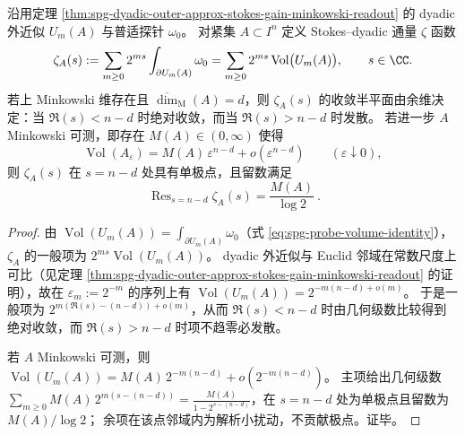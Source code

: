 \begin{proposition}\label{prop:spg-dyadic-flux-zeta-minkowski-pole}
沿用定理 \ref{thm:spg-dyadic-outer-approx-stokes-gain-minkowski-readout} 的 dyadic 外近似 \(U_m(A)\) 与普适探针 \(\omega_0\)。
对紧集 \(A\subset I^n\) 定义 Stokes--dyadic 通量 \(\zeta\) 函数
\[
\zeta_A(s):=\sum_{m\ge 0}2^{ms}\int_{\partial U_m(A)}\omega_0
=\sum_{m\ge 0}2^{ms}\operatorname{Vol}\bigl(U_m(A)\bigr),
\qquad s\in\CC.
\]
若上 Minkowski 维存在且 \(\overline{\dim}_{\mathrm M}(A)=d\)，则 \(\zeta_A(s)\) 的收敛半平面由余维决定：当 \(\Re(s)<n-d\) 时绝对收敛，而当 \(\Re(s)>n-d\) 时发散。
若进一步 \(A\) Minkowski 可测，即存在 \(M(A)\in(0,\infty)\) 使得
\[
\operatorname{Vol}(A_\varepsilon)=M(A)\,\varepsilon^{n-d}+o(\varepsilon^{n-d})\qquad(\varepsilon\downarrow 0),
\]
则 \(\zeta_A(s)\) 在 \(s=n-d\) 处具有单极点，且留数满足
\[
\boxed{\ \operatorname{Res}_{s=n-d}\zeta_A(s)=\frac{M(A)}{\log 2}\ }.
\]
\end{proposition}
\begin{proof}
由 \(\operatorname{Vol}(U_m(A))=\int_{\partial U_m(A)}\omega_0\)（式 \eqref{eq:spg-probe-volume-identity}），\(\zeta_A\) 的一般项为 \(2^{ms}\operatorname{Vol}(U_m(A))\)。
dyadic 外近似与 Euclid 邻域在常数尺度上可比（见定理 \ref{thm:spg-dyadic-outer-approx-stokes-gain-minkowski-readout} 的证明），故在 \(\varepsilon_m:=2^{-m}\) 的序列上有
\(
\operatorname{Vol}(U_m(A))=2^{-m(n-d)+o(m)}
\)。
于是一般项为 \(2^{m(\Re(s)-(n-d))+o(m)}\)，从而 \(\Re(s)<n-d\) 时由几何级数比较得到绝对收敛，而 \(\Re(s)>n-d\) 时项不趋零必发散。
\par
若 \(A\) Minkowski 可测，则 \(\operatorname{Vol}(U_m(A))=M(A)\,2^{-m(n-d)}+o(2^{-m(n-d)})\)。
主项给出几何级数
\(
\sum_{m\ge 0}M(A)\,2^{m(s-(n-d))}=\frac{M(A)}{1-2^{s-(n-d)}}
\)，在 \(s=n-d\) 处为单极点且留数为 \(M(A)/\log 2\)；
余项在该点邻域内为解析小扰动，不贡献极点。证毕。
\end{proof}

